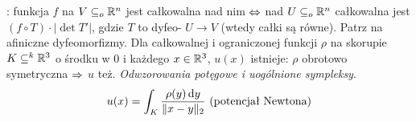 :  funkcja $f$ na $V \subseteq_o \mathbb{R}^n$ jest całkowalna nad nim $\Leftrightarrow$ nad $U \subseteq_o \mathbb{R}^n$ całkowalna jest $(f \circ T) \cdot |{\det T'}|$, gdzie $T$ to dyfeo- $U \to V$ (wtedy całki są równe).
Patrz na afiniczne dyfeomorfizmy.
Dla całkowalnej i ograniczonej funkcji $\rho$ na skorupie $K \subseteq^k \mathbb{R}^3$ o środku w $0$ i każdego $x \in \mathbb{R}^3$, $u(x)$ istnieje: $\rho$ obrotowo symetryczna $\Rightarrow$ $u$ też.
\emph{Odwzorowania potęgowe i uogólnione sympleksy}.
\[
	u(x) = \int_K \frac{\rho(y) \, \textrm{d} y}{\|x - y\|_2} \textrm{ (potencjał Newtona)}
\]





